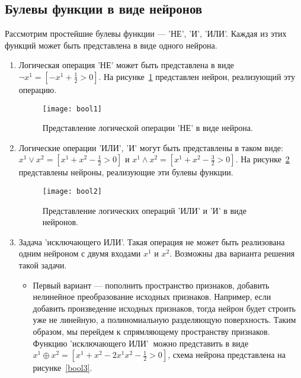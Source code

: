 \documentclass{article}
\begin{document}
	\subsection{Булевы функции в виде нейронов}
	
	Рассмотрим простейшие булевы функции --- 'НЕ', 'И', 'ИЛИ'. Каждая из этих функций может быть представлена в виде одного нейрона. 
	
	\begin{enumerate}
		\item Логическая операция 'НЕ' может быть представлена в виде $\lnot x^1 = [-x^1+\frac{1}{2}>0]$. На рисунке~\ref{bool1} представлен нейрон, реализующий эту операцию.
		
		\begin{figure}[H]
			\begin{center}
				\begin{minipage}{0.5\linewidth}
					\texttt{[image: bool1]}
					\caption{Представление логической операции 'НЕ' в виде нейрона.}
					\label{bool1}
				\end{minipage}
			\end{center}
		\end{figure}
	
		\item Логические операции 'ИЛИ', 'И' могут быть представлены в таком виде: $x^1 \lor x^2 = [x^1+x^2 -\frac{1}{2}>0]$ и $x^1 \wedge x^2 = [x^1+x^2 -\frac{3}{2}>0]$. На рисунке~\ref{bool2} представлены нейроны, реализующие эти булевы функции.
		
		\begin{figure}[H]
			\begin{center}
				\begin{minipage}{0.85\linewidth}
					\texttt{[image: bool2]}
					\caption{Представление логических операций 'ИЛИ' и 'И' в виде нейронов.}
					\label{bool2}
				\end{minipage}
			\end{center}
		\end{figure}
		
		\item Задача 'исключающего ИЛИ'. Такая операция не может быть реализована одним нейроном с двумя входами $x^1$ и $x^2$. Возможны два варианта решения такой задачи. 
		
		\begin{itemize}
			\item  Первый вариант --- пополнить пространство признаков, добавить нелинейное преобразование исходных признаков. Например, если добавить произведение исходных признаков, тогда нейрон будет строить уже не линейную, а полиномиальную разделяющую поверхность. Таким образом, мы перейдем к спрямляющему пространству признаков. Функцию 'исключающего ИЛИ'$~$ можно представить в виде $x^1 \oplus x^2 = [x^1+x^2 -2x^1x^2-\frac{1}{2}>0]$, схема нейрона представлена на рисунке~\ref{bool3}.
			

\end{itemize}
\end{enumerate}
\end{document}
